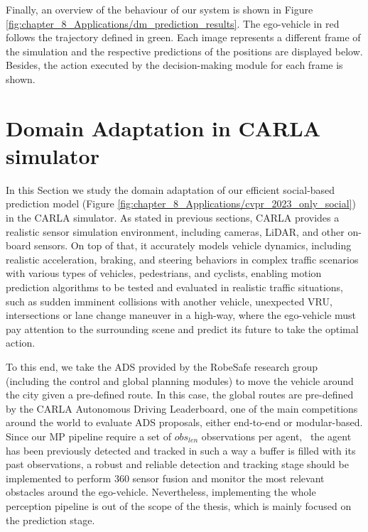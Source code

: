 Finally, an overview of the behaviour of our system is shown in Figure \ref{fig:chapter_8_Applications/dm_prediction_results}. The ego-vehicle in red follows the trajectory defined in green. Each image represents a different frame of the simulation and the respective predictions of the positions are displayed below. Besides, the action executed by the decision-making module for each frame is shown.

\section{Domain Adaptation in CARLA simulator}
\label{sec:8_domain_adaptation_carla}

In this Section we study the domain adaptation of our efficient social-based prediction model (Figure \ref{fig:chapter_8_Applications/cvpr_2023_only_social}) in the CARLA simulator. As stated in previous sections, CARLA provides a realistic sensor simulation environment, including cameras, \ac{LiDAR}, and other on-board sensors. On top of that, it accurately models vehicle dynamics, including realistic acceleration, braking, and steering behaviors in complex traffic scenarios with various types of vehicles, pedestrians, and cyclists, enabling motion prediction algorithms to be tested and evaluated in realistic traffic situations, such as sudden imminent collisions with another vehicle, unexpected \ac{VRU}, intersections or lane change maneuver in a high-way, where the ego-vehicle must pay attention to the surrounding scene and predict its future to take the optimal action. 

To this end, we take the \ac{ADS} provided by the RobeSafe research group (including the control and global planning modules) to move the vehicle around the city given a pre-defined route. In this case, the global routes are pre-defined by the CARLA Autonomous Driving Leaderboard, one of the main competitions around the world to evaluate \ac{ADS} proposals, either end-to-end or modular-based. Since our \ac{MP} pipeline require a set of \textit{$obs_{len}$} observations per agent, \ie \ the agent has been previously detected and tracked in such a way a buffer is filled with its past observations, a robust and reliable detection and tracking stage should be implemented to perform 360 \degree sensor fusion and monitor the most relevant obstacles around the ego-vehicle. Nevertheless, implementing the whole perception pipeline is out of the scope of the thesis, which is mainly focused on the prediction stage.

